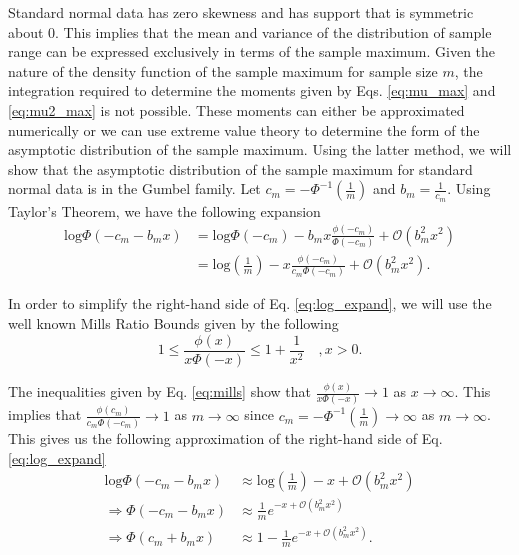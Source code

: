 \documentclass[10pt,letterpaper]{article}\usepackage[]{graphicx}\usepackage[]{color}
\begin{document}
Standard normal data has zero skewness and has support that is symmetric about 0. This implies that the mean and variance of the distribution of sample range can be expressed exclusively in terms of the sample maximum. Given the nature of the density function of the sample maximum for sample size $m$, the integration required to determine the moments given by Eqs. \ref{eq:mu_max} and \ref{eq:mu2_max} is not possible. These moments can either be approximated numerically or we can use extreme value theory to determine the form of the asymptotic distribution of the sample maximum. Using the latter method, we will show that the asymptotic distribution of the sample maximum for standard normal data is in the Gumbel family. Let $c_m = -\Phi^{-1}\left(\frac{1}{m}\right)$ and $b_m = \frac{1}{c_m}$. Using Taylor's Theorem, we have the following expansion
%
\begin{equation}\label{eq:log_expand}
\begin{aligned}
\text{log}\Phi(-c_m - b_m x) &= \text{log}\Phi(-c_m) - b_m x \frac{\phi(-c_m)}{\Phi(-c_m)} + \mathcal{O}(b^2_m x^2) \\
&= \text{log}\left(\frac{1}{m}\right) - x \frac{\phi(-c_m)}{c_m \Phi(-c_m)} + \mathcal{O}(b^2_m x^2).
\end{aligned}
\end{equation}

In order to simplify the right-hand side of Eq. \ref{eq:log_expand}, we will use the well known Mills Ratio Bounds \cite{chatterjee2014} given by the following
%
\begin{equation}\label{eq:mills}
1 \leq \frac{\phi(x)}{x \Phi(-x)} \leq 1 + \frac{1}{x^2} \quad , x > 0.
\end{equation}

The inequalities given by Eq. \ref{eq:mills} show that $\frac{\phi(x)}{x \Phi(-x)} \rightarrow 1$ as $x \rightarrow \infty$. This implies that $\frac{\phi(c_m)}{c_m \Phi(-c_m)} \rightarrow 1$ as $m \rightarrow \infty$ since $c_m = -\Phi^{-1}\left(\frac{1}{m}\right) \rightarrow \infty$ as $m \rightarrow \infty$. This gives us the following approximation of the right-hand side of Eq. \ref{eq:log_expand}
%
\begin{equation}\label{eq:approx_log_expand}
\begin{aligned}
\text{log}\Phi(-c_m - b_m x) &\approx \text{log}\left(\frac{1}{m}\right) - x + \mathcal{O}(b^2_m x^2) \\
\Rightarrow \Phi(-c_m - b_m x) &\approx \frac{1}{m}e^{-x + \mathcal{O}(b^2_m x^2)} \\
\Rightarrow \Phi(c_m + b_m x) &\approx 1 - \frac{1}{m}e^{-x + \mathcal{O}(b^2_m x^2)}.
\end{aligned}
\end{equation}
\end{document}
